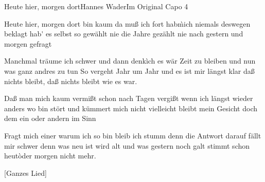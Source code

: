 \begin{song}{Heute hier, morgen dort}{Hannes Wader}{Im Original Capo 4}

Heute hier, morgen dort bin kaum da muß ich fort
hab\` mich niemals deswegen beklagt
hab\'{} es selbst so gewählt nie die Jahre gezählt
nie nach gestern und morgen gefragt

Manchmal träume ich schwer und dann denk\` ich es wär
Zeit zu bleiben und nun was ganz andres zu tun
So vergeht Jahr um Jahr und es ist mir längst klar
daß nichts bleibt, daß nichts bleibt wie es war.

Daß man mich kaum vermißt schon nach Tagen vergißt
wenn ich längst wieder anders wo bin
stört und kümmert mich nicht vielleicht bleibt mein Gesicht
doch dem ein oder andern im Sinn

 

Fragt mich einer warum ich so bin bleib ich stumm
denn die Antwort darauf fällt mir schwer
denn was neu ist wird alt und was gestern noch galt
stimmt schon heut\` oder morgen nicht mehr.

 




[Ganzes Lied]
\end{song}